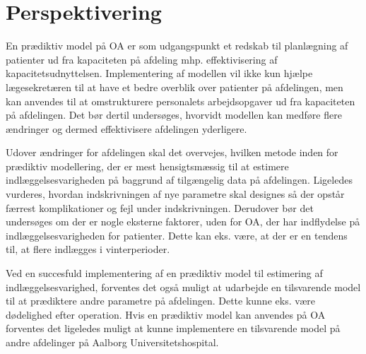 \section{Perspektivering} 
En prædiktiv model på OA er som udgangspunkt et redskab til planlægning af patienter ud fra kapaciteten på afdeling mhp. effektivisering af kapacitetsudnyttelsen. Implementering af modellen vil ikke kun hjælpe lægesekretæren til at have et bedre overblik over patienter på afdelingen, men kan anvendes til at omstrukturere personalets arbejdsopgaver ud fra kapaciteten på afdelingen. Det bør dertil undersøges, hvorvidt modellen kan medføre flere ændringer og dermed effektivisere afdelingen yderligere. 


Udover ændringer for afdelingen skal det overvejes, hvilken metode inden for prædiktiv modellering, der er mest hensigtsmæssig til at estimere indlæggelsesvarigheden på baggrund af tilgængelig data på afdelingen. Ligeledes vurderes, hvordan indskrivningen af nye parametre skal designes så der opstår færrest komplikationer og fejl under indskrivningen. 
Derudover bør det undersøges om der er nogle eksterne faktorer, uden for OA, der har indflydelse på indlæggelsesvarigheden for patienter. Dette kan eks. være, at der er en tendens til, at flere indlægges i vinterperioder.

Ved en succesfuld implementering af en prædiktiv model til estimering af indlæggelsesvarighed, forventes det også muligt at udarbejde en tilsvarende model til at prædiktere andre parametre på afdelingen. Dette kunne eks. være dødelighed efter operation.
Hvis en prædiktiv model kan anvendes på OA forventes det ligeledes muligt at kunne implementere en tilsvarende model på andre afdelinger på Aalborg Universitetshospital.